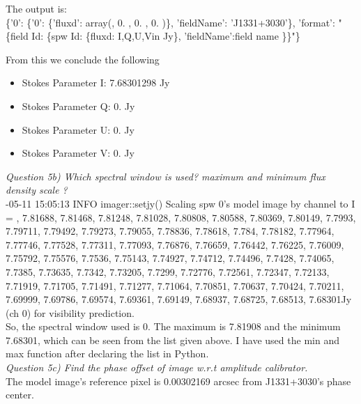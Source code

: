 \documentclass[12pt, a4paper]{article}
\begin{document}
\noindent The output is: \\
{ \tiny \noindent
\{'0': \{'0': \{'fluxd': array(,  0.        ,  0.        ,  0.        \rbrack)\},
       'fieldName': 'J1331+3030'\},
'format': "\{field Id: \{spw Id: \{fluxd: \lbrack I,Q,U,V\rbrack in Jy\}, 'fieldName':field name \}\}"\} 
}

\noindent From this we conclude the following
\begin{itemize}
    \item Stokes Parameter I: 7.68301298 Jy
    \item Stokes Parameter Q: 0. Jy
    \item Stokes Parameter U: 0. Jy
    \item Stokes Parameter V: 0. Jy
\end{itemize}

\noindent \textit{Question 5b) Which spectral window is used? maximum and minimum flux density scale ?} \\
{\tiny {}-05-11 15:05:13     INFO    imager::setjy() Scaling spw 0's model image by channel to I = , 7.81688, 7.81468, 7.81248, 7.81028, 7.80808, 7.80588, 7.80369, 7.80149, 7.7993, 7.79711, 7.79492, 7.79273, 7.79055, 7.78836, 7.78618, 7.784, 7.78182, 7.77964, 7.77746, 7.77528, 7.77311, 7.77093, 7.76876, 7.76659, 7.76442, 7.76225, 7.76009, 7.75792, 7.75576, 7.7536, 7.75143, 7.74927, 7.74712, 7.74496, 7.7428, 7.74065, 7.7385, 7.73635, 7.7342, 7.73205, 7.7299, 7.72776, 7.72561, 7.72347, 7.72133, 7.71919, 7.71705, 7.71491, 7.71277, 7.71064, 7.70851, 7.70637, 7.70424, 7.70211, 7.69999, 7.69786, 7.69574, 7.69361, 7.69149, 7.68937, 7.68725, 7.68513, 7.68301\rbrack Jy (ch 0) for visibility prediction. } \\

So, the spectral window used is 0. The maximum is 7.81908 and the minimum 7.68301, which can be seen from the list given above. I have used the min and max function after declaring the list in Python.\\

\noindent \textit{Question 5c) Find the phase offset of image w.r.t amplitude calibrator.} \\
The model image's reference pixel is 0.00302169 arcsec from J1331+3030's phase center. \\
\end{document}
